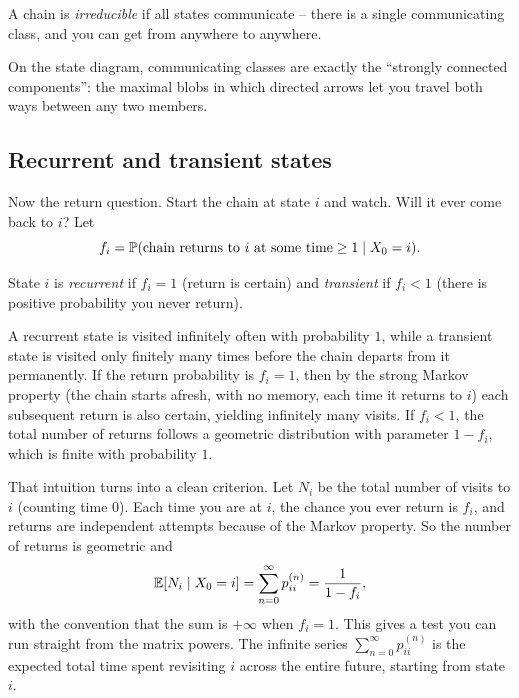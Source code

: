 \begin{definition}[Irreducible]
\label{ch23:def-irreducible}
A chain is \emph{irreducible} if all states communicate -- there is a single communicating
class, and you can get from anywhere to anywhere.
\end{definition}

On the state diagram, communicating classes are exactly the ``strongly connected components'':
the maximal blobs in which directed arrows let you travel both ways between any two members.

\subsection{Recurrent and transient states}

Now the return question. Start the chain at state $i$ and watch. Will it ever come back to
$i$? Let
\[
  f_i = \operatorname{\mathbb{P}}(\text{chain returns to } i \text{ at some time} \ge 1 \mid X_0 = i).
\]

\begin{definition}
\label{ch23:def-recurrent}
State $i$ is \emph{recurrent} if $f_i = 1$ (return is certain) and \emph{transient} if
$f_i < 1$ (there is positive probability you never return).
\end{definition}

\begin{intuitionbox}
A recurrent state is visited infinitely often with probability $1$, while a transient state is
visited only finitely many times before the chain departs from it permanently.
If the return probability is $f_i = 1$, then by the strong Markov property (the chain starts
afresh, with no memory, each time it returns to $i$) each subsequent
return is also certain, yielding infinitely many visits. If $f_i < 1$, the total number of
returns follows a geometric distribution with parameter $1 - f_i$, which is finite with
probability $1$.
\end{intuitionbox}

That intuition turns into a clean criterion. Let $N_i$ be the total number of visits to
$i$ (counting time $0$). Each time you are at $i$, the chance you ever return is $f_i$, and
returns are independent attempts because of the Markov property. So the number of returns is
geometric and
\[
  \operatorname{\mathbb{E}}[N_i \mid X_0 = i] = \sum_{n=0}^{\infty} p_{ii}^{(n)} = \frac{1}{1 - f_i},
\]
with the convention that the sum is $+\infty$ when $f_i = 1$. This gives a test you can run
straight from the matrix powers. The infinite series
$\sum_{n=0}^{\infty} p_{ii}^{(n)}$ is the expected total time spent revisiting $i$
across the entire future, starting from state $i$.


